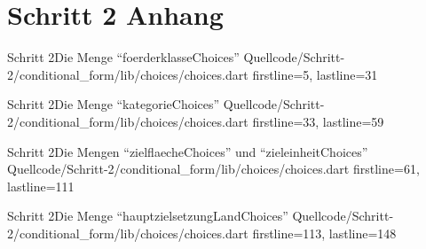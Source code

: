 \chapter{Schritt 2 Anhang} 
\label{appendix:Schritt2Anhang}

\begin{alexlisting}{Schritt 2}{Die Menge \enquote{foerderklasseChoices}}
    {Quellcode/Schritt-2/conditional_form/lib/choices/choices.dart}
    {firstline=5, lastline=31}
    \label{lst:Schritt2FoerderklasseChoices}
\end{alexlisting}

\begin{alexlisting}{Schritt 2}{Die Menge \enquote{kategorieChoices}}
    {Quellcode/Schritt-2/conditional_form/lib/choices/choices.dart}
    {firstline=33, lastline=59}
    \label{lst:Schritt2KategorieChoices}
\end{alexlisting}

\begin{alexlisting}{Schritt 2}{Die Mengen \enquote{zielflaecheChoices} und \enquote{zieleinheitChoices}}
    {Quellcode/Schritt-2/conditional_form/lib/choices/choices.dart}
    {firstline=61, lastline=111}
    \label{lst:Schritt2ZielflaecheChoicesZieleinheitChoices}
\end{alexlisting}

\begin{alexlisting}{Schritt 2}{Die Menge \enquote{hauptzielsetzungLandChoices}}
    {Quellcode/Schritt-2/conditional_form/lib/choices/choices.dart}
    {firstline=113, lastline=148}
    \label{lst:Schritt2hauptzielsetzungLandChoices}
\end{alexlisting}